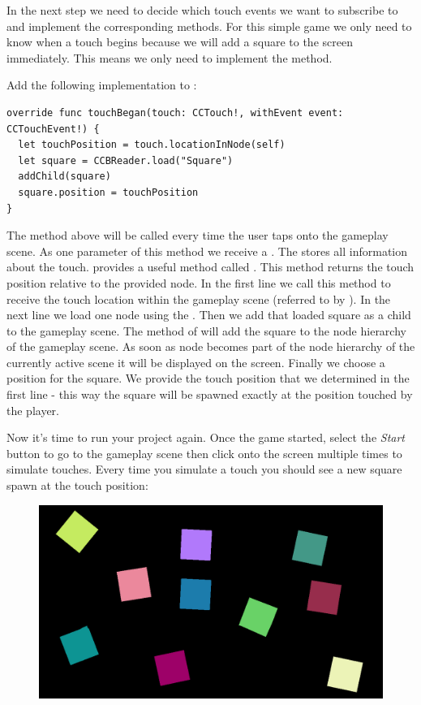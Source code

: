 In the next step we need to decide which touch events we
want to subscribe to and implement the corresponding methods. For this simple
game we only need to know when a touch begins because we will add a square to the
screen immediately. This means we only need to implement the
 method. 

\begin{leftbar}
Add the following implementation to
:
\begin{lstlisting}
override func touchBegan(touch: CCTouch!, withEvent event: CCTouchEvent!) {
  let touchPosition = touch.locationInNode(self)
  let square = CCBReader.load("Square")
  addChild(square)
  square.position = touchPosition
}
\end{lstlisting}
\end{leftbar}

The  method above will be called
every time the user taps onto the gameplay scene. As one parameter of this
method we receive a . The  stores all
information about the touch. \cocos{} provides a useful method called
. This method returns the touch position
relative to the provided node. In the first line we call this method to receive
the touch location within the gameplay scene (referred to by ).
In the next line we load one  node using the
. Then we add that loaded square as a child to the
gameplay scene. The  method of \ccnode{} will add the
square to the node hierarchy of the gameplay scene. As soon as node becomes part
of the node hierarchy of the currently active scene it will be displayed on the
screen. Finally we choose a position for the square.
We provide the touch position that we determined in the first line - this way the square will be spawned exactly at the position touched by
the player. 

Now it's time to run your project again. Once the game started,
select the \textit{Start} button to go to the gameplay scene then click onto the
screen multiple times to simulate touches. Every time you simulate a touch you
should see a new square spawn at the touch position:
\begin{figure}[H]
		\centering
		\includegraphics[width=350pt]{images/firstproject/spinning_squares.png}
\end{figure}

